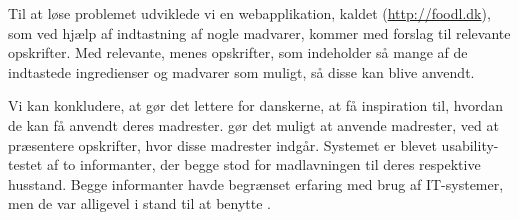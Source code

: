 Til at løse problemet udviklede vi en webapplikation, kaldet \Foodl{} (\url{http://foodl.dk}), som ved hjælp af indtastning af nogle madvarer, kommer med forslag til relevante opskrifter. Med relevante, menes opskrifter, som indeholder så mange af de indtastede ingredienser og madvarer som muligt, så disse kan blive anvendt.

Vi kan konkludere, at \Foodl{} gør det lettere for danskerne, at få inspiration til, hvordan de kan få anvendt deres madrester.
\Foodl{} gør det muligt at anvende madrester, ved at præsentere opskrifter, hvor disse madrester indgår. Systemet er blevet usability-testet af to informanter, der begge stod for madlavningen til deres respektive husstand. Begge informanter havde begrænset erfaring med brug af IT-systemer, men de var alligevel i stand til at benytte \Foodl{}.



